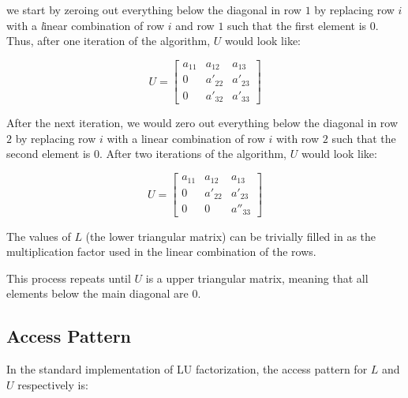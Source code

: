 \documentclass[12]{article}
\begin{document}
we start by  zeroing out everything below the diagonal in row $1$ by replacing row $i$ with a {\emph linear combination} of row $i$ and row $1$ such that the first element is $0$.  Thus, after one iteration of the algorithm, $U$ would look like:

$$
U = 
\begin{bmatrix}
	a_{11} &  a_{12} &  a_{13}  \\
	0  &  a'_{22} &  a'_{23}  \\
	0  &  a'_{32}  &  a'_{33}
\end{bmatrix}
$$

After the next iteration, we would zero out everything below the diagonal in row $2$ by replacing row $i$ with a linear combination of row $i$ with row $2$ such that the second element is $0$.  After two iterations of the algorithm, $U$ would look like:

$$
U = 
\begin{bmatrix}
	a_{11} &  a_{12} &  a_{13}  \\
	0  &  a'_{22} &  a'_{23}  \\
	0  &  0  &  a''_{33}
\end{bmatrix}
$$

The values of $L$ (the lower triangular matrix) can be trivially filled in as the multiplication factor used in the linear combination of the rows.  

This process repeats until $U$ is a upper triangular matrix, meaning that all elements below the main diagonal are $0$. 

\subsection{Access Pattern}

In the standard implementation of LU factorization, the access pattern for $L$ and $U$ respectively is:
\end{document}
